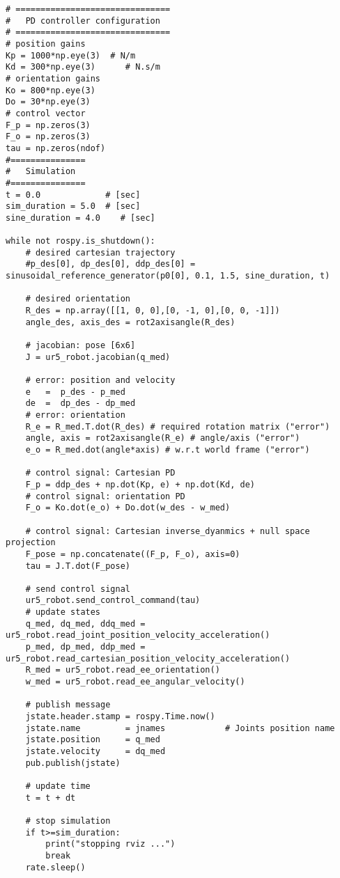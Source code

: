 \begin{lstlisting}
# ===============================
#   PD controller configuration
# ===============================
# position gains
Kp = 1000*np.eye(3)  # N/m
Kd = 300*np.eye(3)      # N.s/m
# orientation gains
Ko = 800*np.eye(3)   
Do = 30*np.eye(3)
# control vector
F_p = np.zeros(3)    
F_o = np.zeros(3)
tau = np.zeros(ndof)
#===============
#   Simulation
#===============
t = 0.0             # [sec] 
sim_duration = 5.0  # [sec]
sine_duration = 4.0    # [sec]

while not rospy.is_shutdown():
    # desired cartesian trajectory
    #p_des[0], dp_des[0], ddp_des[0] = sinusoidal_reference_generator(p0[0], 0.1, 1.5, sine_duration, t)
    
    # desired orientation
    R_des = np.array([[1, 0, 0],[0, -1, 0],[0, 0, -1]])
    angle_des, axis_des = rot2axisangle(R_des)
    
    # jacobian: pose [6x6]
    J = ur5_robot.jacobian(q_med)  

    # error: position and velocity
    e 	=  p_des - p_med
    de 	=  dp_des - dp_med    
    # error: orientation
    R_e = R_med.T.dot(R_des) # required rotation matrix ("error")
    angle, axis = rot2axisangle(R_e) # angle/axis ("error")
    e_o = R_med.dot(angle*axis) # w.r.t world frame ("error")

    # control signal: Cartesian PD
    F_p = ddp_des + np.dot(Kp, e) + np.dot(Kd, de)
    # control signal: orientation PD
    F_o = Ko.dot(e_o) + Do.dot(w_des - w_med)
    
    # control signal: Cartesian inverse_dyanmics + null space projection
    F_pose = np.concatenate((F_p, F_o), axis=0)
    tau = J.T.dot(F_pose) 
    
    # send control signal
    ur5_robot.send_control_command(tau)
    # update states
    q_med, dq_med, ddq_med = ur5_robot.read_joint_position_velocity_acceleration()
    p_med, dp_med, ddp_med = ur5_robot.read_cartesian_position_velocity_acceleration()
    R_med = ur5_robot.read_ee_orientation()
    w_med = ur5_robot.read_ee_angular_velocity()

    # publish message
    jstate.header.stamp = rospy.Time.now()
    jstate.name 		= jnames			# Joints position name
    jstate.position 	= q_med
    jstate.velocity 	= dq_med
    pub.publish(jstate)

    # update time
    t = t + dt  
    
    # stop simulation
    if t>=sim_duration:
        print("stopping rviz ...")
        break
    rate.sleep()
\end{lstlisting}

